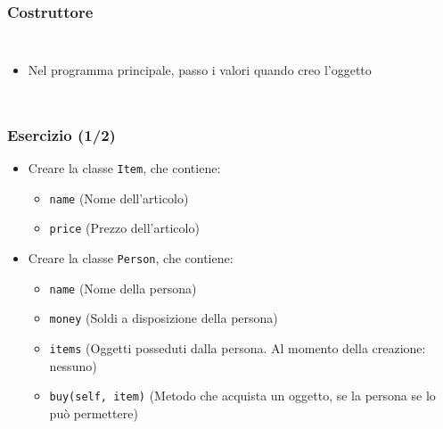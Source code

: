 \begin{contentframe}
    \frametitle{Costruttore}

    \begin{columns}
        \begin{itemize}
            \item Nel programma principale, passo i valori quando creo l'oggetto
        \end{itemize}
        
        \centering
    \end{columns}
\end{contentframe}

\begin{exerciseframe}
    \frametitle{Esercizio (1/2)}

    \begin{itemize}
        \item Creare la classe \texttt{Item}, che contiene:
        \begin{itemize}
            \item \texttt{name} (Nome dell'articolo)
            \item \texttt{price} (Prezzo dell'articolo)
        \end{itemize}

        \bigskip
        \item Creare la classe \texttt{Person}, che contiene:
        \begin{itemize}
            \item \texttt{name} (Nome della persona)
            \item \texttt{money} (Soldi a disposizione della persona)
            \item \texttt{items} (Oggetti posseduti dalla persona. Al momento della creazione: nessuno)
            \item \texttt{buy(self, item)} (Metodo che acquista un oggetto, se la persona se lo può permettere)
        \end{itemize}
    \end{itemize}
\end{exerciseframe}

